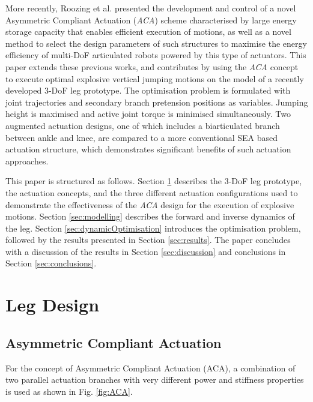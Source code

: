 \documentclass[letterpaper, 10 pt, conference]{ieeeconf}  %
\begin{document}
More recently, Roozing et al. \cite{roozing2016development, roozing2016design} presented the development and control of a novel Asymmetric Compliant Actuation (\textit{ACA}) scheme characterised by large energy storage capacity that enables efficient execution of motions, as well as a novel method to select the design parameters of such structures to maximise the energy efficiency of multi-DoF articulated robots powered by this type of actuators. This paper extends these previous works, and contributes by using the \textit{ACA} concept to execute optimal explosive vertical jumping motions on the model of a recently developed 3-DoF leg prototype. The optimisation problem is formulated with joint trajectories and secondary branch pretension positions as variables. Jumping height is maximised and active joint torque is minimised simultaneously. Two augmented actuation designs, one of which includes a biarticulated branch between ankle and knee, are compared to a more conventional SEA based actuation structure, which demonstrates significant benefits of such actuation approaches.

This paper is structured as follows. Section \ref{sec:legDesign} describes the 3-DoF leg prototype, the actuation concepts, and the three different actuation configurations used to demonstrate the effectiveness of the \textit{ACA} design for the execution of explosive motions. Section \ref{sec:modelling} describes the forward and inverse dynamics of the leg. Section \ref{sec:dynamicOptimisation} introduces the optimisation problem, followed by the results presented in Section \ref{sec:results}. The paper concludes with a discussion of the results in Section \ref{sec:discussion} and conclusions in Section \ref{sec:conclusions}.


\section{Leg Design}
\label{sec:legDesign}

\subsection{Asymmetric Compliant Actuation}
\label{subsec:ACA}
For the concept of Asymmetric Compliant Actuation (ACA), a combination of two parallel actuation branches with very different power and stiffness properties is used as shown in Fig. \ref{fig:ACA}.
\end{document}
